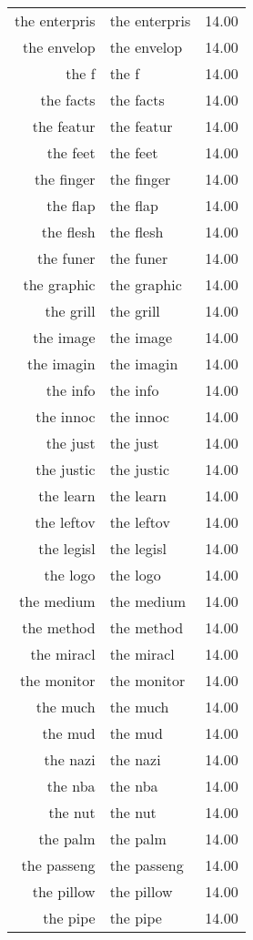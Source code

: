 \begin{table}[ht]
\begin{tabular}{rlr}
  the enterpris & the enterpris & 14.00 \\ 
  the envelop & the envelop & 14.00 \\ 
  the f & the f & 14.00 \\ 
  the facts & the facts & 14.00 \\ 
  the featur & the featur & 14.00 \\ 
  the feet & the feet & 14.00 \\ 
  the finger & the finger & 14.00 \\ 
  the flap & the flap & 14.00 \\ 
  the flesh & the flesh & 14.00 \\ 
  the funer & the funer & 14.00 \\ 
  the graphic & the graphic & 14.00 \\ 
  the grill & the grill & 14.00 \\ 
  the image & the image & 14.00 \\ 
  the imagin & the imagin & 14.00 \\ 
  the info & the info & 14.00 \\ 
  the innoc & the innoc & 14.00 \\ 
  the just & the just & 14.00 \\ 
  the justic & the justic & 14.00 \\ 
  the learn & the learn & 14.00 \\ 
  the leftov & the leftov & 14.00 \\ 
  the legisl & the legisl & 14.00 \\ 
  the logo & the logo & 14.00 \\ 
  the medium & the medium & 14.00 \\ 
  the method & the method & 14.00 \\ 
  the miracl & the miracl & 14.00 \\ 
  the monitor & the monitor & 14.00 \\ 
  the much & the much & 14.00 \\ 
  the mud & the mud & 14.00 \\ 
  the nazi & the nazi & 14.00 \\ 
  the nba & the nba & 14.00 \\ 
  the nut & the nut & 14.00 \\ 
  the palm & the palm & 14.00 \\ 
  the passeng & the passeng & 14.00 \\ 
  the pillow & the pillow & 14.00 \\ 
  the pipe & the pipe & 14.00 \\ 

\end{tabular}
\end{table}
